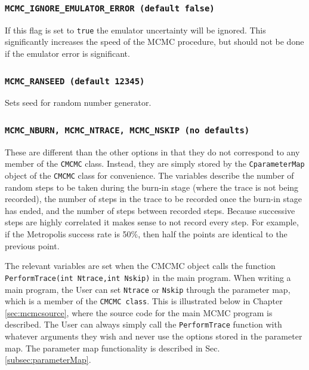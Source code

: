 \documentclass[UserManual.tex]{subfiles}
\begin{document}
\begin{sloppypar}
\subsubsection{{\tt MCMC\_IGNORE\_EMULATOR\_ERROR (default false)}}
If this flag is set to {\tt true} the emulator uncertainty will be ignored. This significantly increases the speed of the MCMC procedure, but should not be done if the emulator error is significant.
\subsubsection{{\tt MCMC\_RANSEED (default 12345)}}
Sets seed for random number generator.
\subsubsection{{\tt MCMC\_NBURN, MCMC\_NTRACE, MCMC\_NSKIP (no defaults)}}
These are different than the other options in that they do not correspond to any member of the {\tt CMCMC} class. Instead, they are simply stored by the {\tt CparameterMap} object of the {\tt CMCMC} class for convenience. The variables describe the number of random steps to be taken during the burn-in stage (where the trace is not being recorded), the number of steps in the trace to be recorded once the burn-in stage has ended, and the number of steps between recorded steps. Because successive steps are highly correlated it makes sense to not record every step. For example, if the Metropolis success rate is 50\%, then half the points are identical to the previous point.

The relevant variables are set when the CMCMC object calls the function {\tt PerformTrace(int Ntrace,int Nskip)} in the main program. When writing a main program, the User can set {\tt Ntrace} or {\tt Nskip} through the parameter map, which is a member of the {\tt CMCMC class}. This is illustrated below in Chapter \ref{sec:mcmcsource}, where the source code for the main MCMC program is described. The User can always simply call the {\tt PerformTrace} function with whatever arguments they wish and never use the options stored in the parameter map. The parameter map functionality is described in Sec. \ref{subsec:parameterMap}.


\end{sloppypar}
\end{document}
